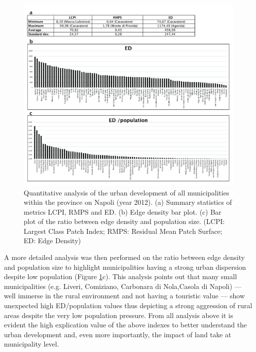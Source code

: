 \documentclass[APA,LATO1COL,doublespace]{WileyNJD-v2}
\begin{document}
\begin{figure}
    \centerline{
        \includegraphics[width=520pt]{08_caso_comunale_tabella_grafici}
    }
    \caption{Quantitative analysis of the urban development of all municipalities within the province on Napoli (year 2012).
             (a) Summary statistics of metrics LCPI, RMPS and ED.
             (b) Edge density bar plot.
             (c) Bar plot of the ratio between edge density and population size.
             (LCPI: Largest Class Patch Index; 
             RMPS: Residual Mean Patch Surface; 
             ED: Edge Density)
            }
    \label{fig:caseCOM_urbDev}
\end{figure}

A more detailed analysis was then performed on the ratio between edge density and population size to highlight municipalities having a strong urban dispersion despite low population (Figure \ref{fig:caseCOM_urbDev}c).
This analysis points out that many small municipalities (e.g. Liveri, Comiziano, Carbonara di Nola,Casola di Napoli) --- well immerse in the rural environment and not having a touristic value --- show unexpected high ED/population values thus depicting a strong aggression of rural areas despite the very low population pressure.
From all analysis above it is evident the high explication value of the above indexes to better understand the urban development and, even more importantly, the impact of land take at municipality level.
\end{document}

